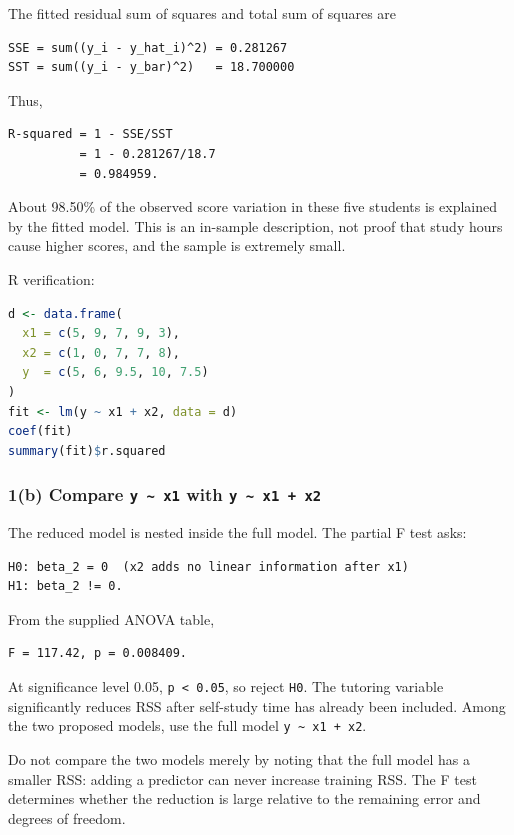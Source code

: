 ﻿\documentclass[11pt]{article}
\begin{document}
The fitted residual sum of squares and total sum of squares are

\begin{lstlisting}
SSE = sum((y_i - y_hat_i)^2) = 0.281267
SST = sum((y_i - y_bar)^2)   = 18.700000
\end{lstlisting}

Thus,

\begin{lstlisting}
R-squared = 1 - SSE/SST
          = 1 - 0.281267/18.7
          = 0.984959.
\end{lstlisting}

About 98.50\% of the observed score variation in these five students is explained
by the fitted model. This is an in-sample description, not proof that study hours
cause higher scores, and the sample is extremely small.

R verification:

\begin{lstlisting}[language=R]
d <- data.frame(
  x1 = c(5, 9, 7, 9, 3),
  x2 = c(1, 0, 7, 7, 8),
  y  = c(5, 6, 9.5, 10, 7.5)
)
fit <- lm(y ~ x1 + x2, data = d)
coef(fit)
summary(fit)$r.squared
\end{lstlisting}

\subsubsection{1(b) Compare \texttt{y \textasciitilde{} x1} with \texttt{y \textasciitilde{} x1 + x2}}

The reduced model is nested inside the full model. The partial F test asks:

\begin{lstlisting}
H0: beta_2 = 0  (x2 adds no linear information after x1)
H1: beta_2 != 0.
\end{lstlisting}

From the supplied ANOVA table,

\begin{lstlisting}
F = 117.42, p = 0.008409.
\end{lstlisting}

At significance level 0.05, \texttt{p < 0.05}, so reject \texttt{H0}. The tutoring variable
significantly reduces RSS after self-study time has already been included. Among
the two proposed models, use the full model \texttt{y \textasciitilde{} x1 + x2}.

Do not compare the two models merely by noting that the full model has a smaller
RSS: adding a predictor can never increase training RSS. The F test determines
whether the reduction is large relative to the remaining error and degrees of
freedom.
\end{document}
